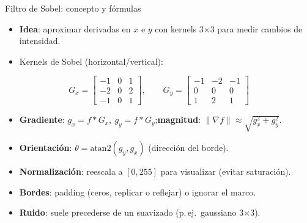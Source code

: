 \documentclass[10pt]{beamer}
\begin{document}
\begin{frame}{Filtro de Sobel: concepto y f\'ormulas}
\begin{itemize}
  \item \textbf{Idea}: aproximar derivadas en $x$ e $y$ con kernels 3$\times$3 para medir cambios de intensidad.
  \item Kernels de Sobel (horizontal/vertical):
\end{itemize}
\vspace{-2mm}
\[
G_x=\begin{bmatrix}-1 & 0 & 1\\[-2pt]-2 & 0 & 2\\[-2pt]-1 & 0 & 1\end{bmatrix},
\qquad
G_y=\begin{bmatrix}-1 & -2 & -1\\[-2pt]0 & 0 & 0\\[-2pt]1 & 2 & 1\end{bmatrix}
\]
\vspace{-4mm}
\begin{itemize}
  \item \textbf{Gradiente}: $g_x=f*G_x,\ g_y=f*G_y$;\quad \textbf{magnitud}: $\lVert\nabla f\rVert\approx \sqrt{g_x^2+g_y^2}$.
  \item \textbf{Orientaci\'on}: $\theta=\mathrm{atan2}(g_y,g_x)$ (direcci\'on del borde).
  \item \textbf{Normalizaci\'on}: reescala a $[0,255]$ para visualizar (evitar saturaci\'on).
  \item \textbf{Bordes}: padding (ceros, replicar o reflejar) o ignorar el marco.
  \item \textbf{Ruido}: suele precederse de un suavizado (p.\,ej.\ gaussiano 3$\times$3).
\end{itemize}
\end{frame}
\end{document}
